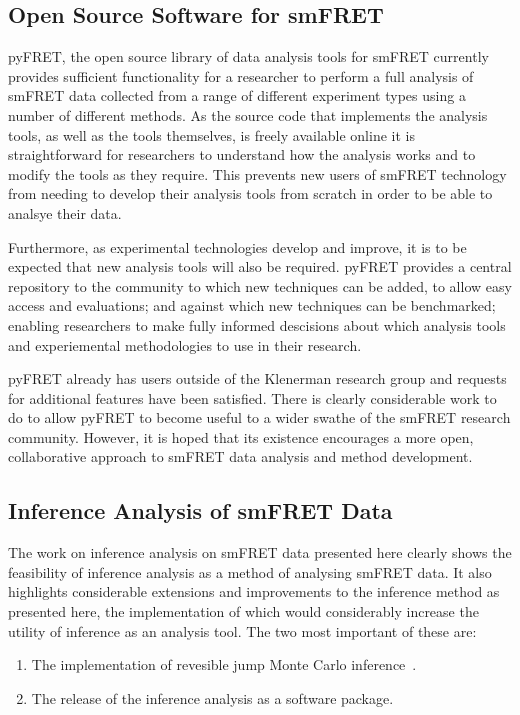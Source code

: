 \subsection{Open Source Software for smFRET}
pyFRET, the open source library of data analysis tools for smFRET currently provides sufficient functionality for a researcher to perform a full analysis of smFRET data collected from a range of different experiment types using a number of different methods. As the source code that implements the analysis tools, as well as the tools themselves, is freely available online it is straightforward for researchers to understand how the analysis works and to modify the tools as they require. This prevents new users of smFRET technology from needing to develop their analysis tools from scratch in order to be able to analsye their data. 

Furthermore, as experimental technologies develop and improve, it is to be expected that new analysis tools will also be required. pyFRET provides a central repository to the community to which new techniques can be added, to allow easy access and evaluations; and against which new techniques can be benchmarked; enabling researchers to make fully informed descisions about which analysis tools and experiemental methodologies to use in their research.

pyFRET already has users outside of the Klenerman research group and requests for additional features have been satisfied. There is clearly considerable work to do to allow pyFRET to become useful to a wider swathe of the smFRET research community. However, it is hoped that its existence encourages a more open, collaborative approach to smFRET data analysis and method development. 

\subsection{Inference Analysis of smFRET Data}
The work on inference analysis on smFRET data presented here clearly shows the feasibility of inference analysis as a method of analysing smFRET data. It also highlights considerable extensions and improvements to the inference method as presented here, the implementation of which would considerably increase the utility of inference as an analysis tool. The two most important of these are:

\begin{enumerate}
\item The implementation of revesible jump Monte Carlo inference~\cite{green1995}.
\item The release of the inference analysis as a software package.
\end{enumerate}

